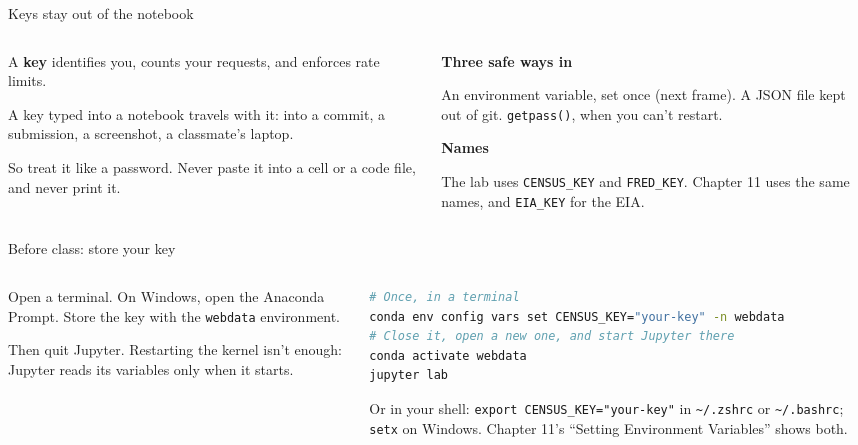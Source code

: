 \documentclass[9pt,aspectratio=169]{beamer}
\begin{document}
\begin{frame}{Keys stay out of the notebook}
    \begin{columns}[T]
        \begin{column}{0.6\textwidth}
            A \textbf{key} identifies you, counts your requests, and enforces rate limits.

            \medskip
            A key typed into a notebook travels with it: into a commit, a submission, a screenshot, a classmate's laptop.

            \medskip
            So treat it like a password. Never paste it into a cell or a code file, and never print it.
        \end{column}
        \begin{column}{0.35\textwidth}
            \textbf{Three safe ways in}\\[2pt]
            {\footnotesize An environment variable, set once (next frame). A JSON file kept out of git. \texttt{getpass()}, when you can't restart.\par}
            \medskip
            \textbf{Names}\\[2pt]
            {\footnotesize The lab uses \texttt{CENSUS\_KEY} and \texttt{FRED\_KEY}. Chapter 11 uses the same names, and \texttt{EIA\_KEY} for the EIA.\par}
        \end{column}
    \end{columns}
\end{frame}

\begin{frame}[fragile]{Before class: store your key}
    \begin{columns}[T]
        \begin{column}{0.37\textwidth}
            Open a terminal. On Windows, open the Anaconda Prompt. Store the key with the \texttt{webdata} environment.

            \medskip
            Then quit Jupyter. Restarting the kernel isn't enough: Jupyter reads its variables only when it starts.
        \end{column}
        \begin{column}{0.6\textwidth}
\begin{lstlisting}[language=bash]
# Once, in a terminal
conda env config vars set CENSUS_KEY="your-key" -n webdata
# Close it, open a new one, and start Jupyter there
conda activate webdata
jupyter lab
\end{lstlisting}
            {\scriptsize Or in your shell: \texttt{export CENSUS\_KEY="your-key"} in \texttt{\textasciitilde/.zshrc} or \texttt{\textasciitilde/.bashrc}; \texttt{setx} on Windows. Chapter 11's ``Setting Environment Variables'' shows both.\par}
        \end{column}
    \end{columns}
\end{frame}
\end{document}
